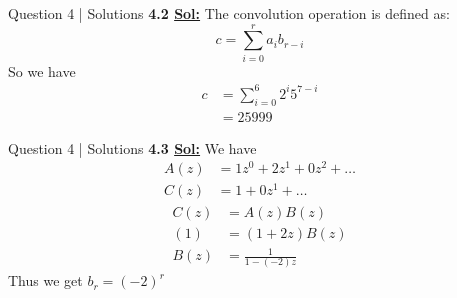 \documentclass[xcolor=svgnames]{beamer}
\begin{document}
\begin{frame}{Question 4 | Solutions}
    \textbf{4.2 \underline{Sol:}} The convolution operation is defined as: 
    \[
        c = \sum_{i = 0}^{r} a_i b_{r - i}
    \]
    So we have 
    \begin{align*}
        c &= \sum_{i = 0}^6 2^i 5^{7-i}
        \\ &= 25999
    \end{align*}
\end{frame}

\begin{frame}{Question 4 | Solutions}
    \textbf{4.3 \underline{Sol:}} 
    We have 
    \begin{align*}
        A(z) &= 1z^0 + 2z^1 + 0z^2 + \ldots
        \\ C(z) &= 1 + 0z^1 + \ldots
    \end{align*}
        \begin{align*}
            C(z)  &=  A(z)B(z)
            \\ (1) &= (1 + 2z) B(z)
            \\ B(z) &= \frac{1}{1 - (-2)z}
        \end{align*} 
        Thus we get $b_r = (-2)^{r}$
\end{frame}
\end{document}
